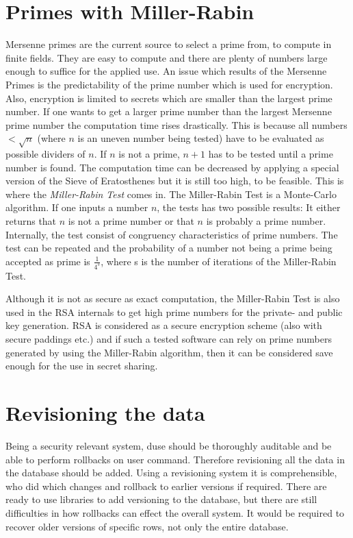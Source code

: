 \section{Primes with Miller-Rabin}

Mersenne primes are the current source to select a prime from, to compute in
finite fields. They are easy to compute and there are plenty of numbers large
enough to suffice for the applied use. An issue which results of the Mersenne
Primes is the predictability of the prime number which is used for encryption.
Also, encryption is limited to secrets which are smaller than the largest prime
number. If one wants to get a larger prime number than the largest Mersenne
prime number the computation time rises drastically. This is because all
numbers $< \sqrt{n}$ (where $n$ is an uneven number being tested) have to be
evaluated as possible dividers of $n$. If $n$ is not a prime, $n+1$ has to be
tested until a prime number is found. The computation time can be decreased by
applying a special version of the Sieve of Eratosthenes but it is still too
high, to be feasible. This is where the \textit{Miller-Rabin Test} comes in.
The Miller-Rabin Test is a Monte-Carlo algorithm. If one inputs a number $n$,
the tests has two possible results: It either returns that $n$ is not a prime
number or that $n$ is probably a prime number.  Internally, the test consist of
congruency characteristics of prime numbers.  The test can be repeated and the
probability of a number not being a prime being accepted as prime is
$\frac{1}{4^s}$, where s is the number of iterations of the Miller-Rabin Test.

Although it is not as secure as exact computation, the Miller-Rabin Test is
also used in the RSA internals to get high prime numbers for the private- and
public key generation. RSA is considered as a secure encryption scheme (also
with secure paddings etc.) and if such a tested software can rely on prime
numbers generated by using the Miller-Rabin algorithm, then it can be
considered save enough for the use in secret sharing.

\section{Revisioning the data}

Being a security relevant system, duse should be thoroughly auditable and be
able to perform rollbacks on user command. Therefore revisioning all the data
in the database should be added. Using a revisioning system it is
comprehensible, who did which changes and rollback to earlier versions if
required. There are ready to use libraries to add versioning to the database,
but there are still difficulties in how rollbacks can effect the overall
system. It would be required to recover older versions of specific rows, not
only the entire database.

